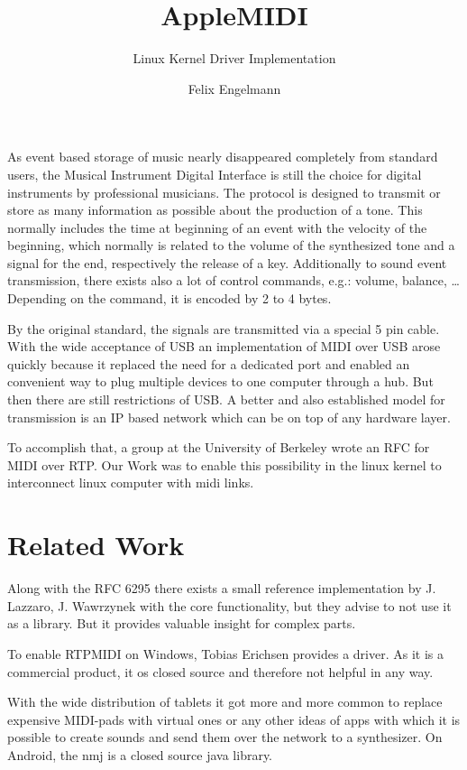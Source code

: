 \documentclass[paper=a4,fontsize=11pt,twocolumn,pagesize,bibtotoc]{scrartcl}
\title{AppleMIDI}
\subtitle{Linux Kernel Driver Implementation}
\author{Felix Engelmann}
\begin{document}
	\maketitle
	
	As event based storage of music nearly disappeared completely from standard users, the 
	Musical Instrument Digital Interface
	is still the choice for digital instruments by professional musicians. The protocol is designed to transmit or store as many information as possible about the production of a tone. This normally includes the time at beginning of an event with the velocity of the beginning, which normally is related to the volume of the synthesized tone and a signal for the end, respectively the release of a key. Additionally to sound event transmission, there exists also a lot of control commands, e.g.: volume, balance, \dots
	Depending on the command, it is encoded by 2 to 4 bytes.
	
	By the original standard, the signals are transmitted via a special 5 pin cable. With the wide acceptance of USB an implementation of MIDI over USB arose quickly because it replaced the need for a dedicated port and enabled an convenient way to plug multiple devices to one computer through a hub. But then there are still restrictions of USB. A better and also established model for transmission is an IP based network which can be on top of any hardware layer.
	
	To accomplish that, a group at the University of Berkeley wrote an RFC for MIDI over RTP. Our Work was to enable this possibility in the linux kernel to interconnect linux computer with midi links.
	
	\section{Related Work}
	Along with the RFC 6295 there exists a small reference implementation by 
	J. Lazzaro, J. Wawrzynek
	with the core functionality, but they advise to not use it as a library. But it provides valuable insight for complex parts.
	
	To enable RTPMIDI on Windows,
	Tobias Erichsen
	provides a driver. As it is a commercial product, it os closed source and therefore not helpful in any way.
	
	With the wide distribution of tablets it got more and more common to replace expensive MIDI-pads with virtual ones or any other ideas of apps with which it is possible to create sounds and send them over the network to a synthesizer. On Android, the nmj is a closed source java library.
	
\end{document}
